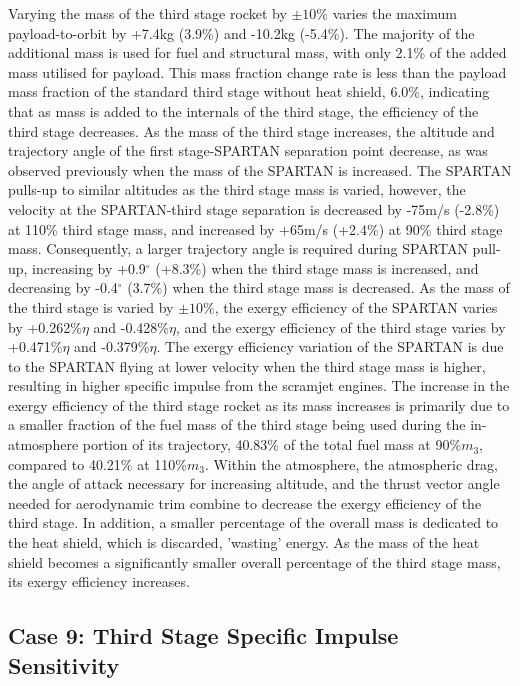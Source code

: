 Varying the mass of the third stage rocket by $\pm10\%$ varies the maximum payload-to-orbit by +7.4kg (3.9\%) and -10.2kg (-5.4\%). 
The majority of the additional mass is used for fuel and structural mass, with only 2.1\% of the added mass utilised for payload. This mass fraction change rate is less than the payload mass fraction of the standard third stage without heat shield, 6.0\%, indicating that as mass is added to the internals of the third stage, the efficiency of the third stage decreases.
 As the mass of the third stage increases, the altitude and trajectory angle of the first stage-SPARTAN separation point decrease, as was observed previously when the mass of the SPARTAN is increased. 
 The SPARTAN pulls-up to similar altitudes as the third stage mass is varied, however, the velocity at the SPARTAN-third stage separation is decreased by -75m/s (-2.8\%) at 110\% third stage mass, and increased by +65m/s (+2.4\%)  at 90\% third stage mass. 
 Consequently, a larger trajectory angle is required during SPARTAN pull-up, increasing by +0.9$^\circ$ (+8.3\%) when the third stage mass is increased, and decreasing by -0.4$^\circ$ (3.7\%) when the third stage mass is decreased. 
As the mass of the third stage is varied by $\pm10\%$, the exergy efficiency of the SPARTAN varies by +0.262\%$\eta$ and -0.428\%$\eta$, and the exergy efficiency of the third stage varies by +0.471\%$\eta$ and -0.379\%$\eta$. The exergy efficiency variation of the SPARTAN is due to the SPARTAN flying at lower velocity when the third stage mass is higher, resulting in higher specific impulse from the scramjet engines. 
The increase in the exergy efficiency of the third stage rocket as its mass increases is primarily due to a smaller fraction of the fuel mass of the third stage being used during the in-atmosphere portion of its trajectory, 40.83\% of the total fuel mass at 90\%$m_3$, compared to 40.21\% at 110\%$m_3$. Within the atmosphere, the atmospheric drag, the angle of attack necessary for increasing altitude, and the thrust vector angle needed for aerodynamic trim combine to decrease the exergy efficiency of the third stage.
In addition, a smaller percentage of the overall mass is dedicated to the heat shield, which is discarded, 'wasting' energy. As the mass of the heat shield becomes a significantly smaller overall percentage of the third stage mass, its exergy efficiency increases. 



\subsection{Case 9: Third Stage Specific Impulse Sensitivity}\label{sec:isp3NoReturn}


